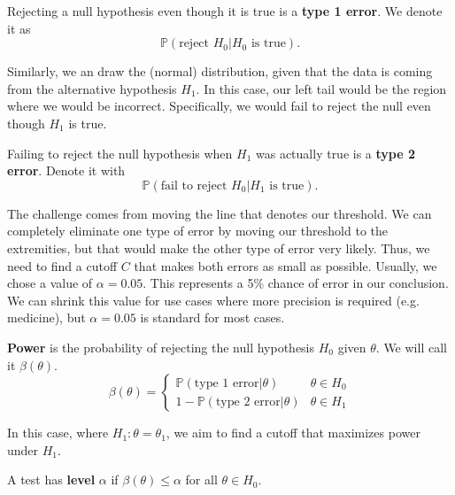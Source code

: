 \documentclass[titlepage, 12pt, leqno]{article}
\begin{document}
\begin{definition}
    Rejecting a null hypothesis even though it is true is a \textbf{type 1 
    error}. We denote it as
    \[
        \mathbb{P}( \text{reject } H_{0} | H_{0} \text{ is true}).
    \]
\end{definition}

Similarly, we an draw the (normal) distribution, given that the data is coming
from the alternative hypothesis $H_{1}$. In this case, our left tail would be
the region where we would be incorrect. Specifically, we would fail to reject
the null even though $H_{1}$ is true.

\begin{definition}
    Failing to reject the null hypothesis when $H_{1}$ was actually true is a
    \textbf{type 2 error}. Denote it with
    \[
        \mathbb{P}( \text{fail to reject } H_{0} | H_{1} \text{ is true}).
    \]
\end{definition}
The challenge comes from moving the line that denotes our threshold. We can
completely eliminate one type of error by moving our threshold to the
extremities, but that would make the other type of error very likely. Thus, we
need to find a cutoff $C$ that makes both errors as small as possible. 
Usually, we chose a value of $\alpha = 0.05$. This represents a 5\% chance of
error in our conclusion. We can shrink this value for use cases where more
precision is required (e.g. medicine), but $\alpha = 0.05$ is standard for most
cases.

\begin{definition}
    \textbf{Power} is the probability of rejecting the null hypothesis $H_{0}$
    given $\theta$. We will call it $\beta(\theta)$. 
    \[
        \beta(\theta) =
        \begin{cases}
            \mathbb{P}( \text{type 1 error} | \theta) & \theta \in H_{0} \\
            1 - \mathbb{P}( \text{type 2 error} | \theta) & \theta \in H_{1}
        \end{cases}
    \]
\end{definition}

In this case, where $H_{1} : \theta = \theta_{1}$, we aim to find a cutoff that
maximizes power under $H_{1}$.

\begin{definition}
    A test has \textbf{level} $\alpha$ if $\beta(\theta) \le \alpha$ for all
    $\theta \in  H_{0}$.
\end{definition}
\end{document}
